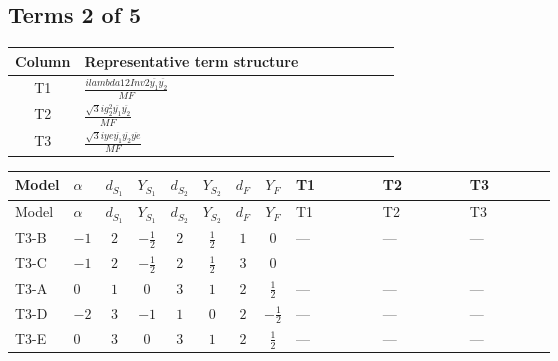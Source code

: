 \documentclass[8pt]{article}
\begin{document}
\begin{landscape}
\subsection*{Terms 2 of 5}
\begin{center}
\begin{tabular}{@{}c >{\raggedright\arraybackslash}p{0.82\linewidth}@{}}
\toprule
Column & Representative term structure \\
\midrule
T1 & \(\displaystyle \frac{i lambda12Inv2 \overline{y_{1}} \overline{y_{2}}}{MF}\) \\
\midrule
T2 & \(\displaystyle \frac{\sqrt{3} i g_{2}^{2} \overline{y_{1}} \overline{y_{2}}}{MF}\) \\
\midrule
T3 & \(\displaystyle \frac{\sqrt{3} i ye \overline{y_{1}} \overline{y_{2}} \overline{ye}}{MF}\) \\
\midrule
\bottomrule
\end{tabular}
\end{center}
\smallskip
\tiny
\begin{longtable}{@{}llcccccc >{\raggedright\arraybackslash}p{0.21\linewidth} >{\raggedright\arraybackslash}p{0.21\linewidth} >{\raggedright\arraybackslash}p{0.21\linewidth}@{}}
\toprule
Model & $\alpha$ & $d_{S_1}$ & $Y_{S_1}$ & $d_{S_2}$ & $Y_{S_2}$ & $d_F$ & $Y_F$ & T1 & T2 & T3 \\
\midrule
\endfirsthead
\toprule
Model & $\alpha$ & $d_{S_1}$ & $Y_{S_1}$ & $d_{S_2}$ & $Y_{S_2}$ & $d_F$ & $Y_F$ & T1 & T2 & T3 \\
\midrule
\endhead
T3-B & $-1$ & $2$ & $-\frac{1}{2}$ & $2$ & $\frac{1}{2}$ & $1$ & $0$ & --- & --- & --- \\
\midrule
T3-C & $-1$ & $2$ & $-\frac{1}{2}$ & $2$ & $\frac{1}{2}$ & $3$ & $0$ & \scriptsize\adjustbox{max width=\linewidth}{$\begin{gathered} - \frac{2 i lambda12Inv2 \overline{y_{1}} \overline{y_{2}}}{3 MF}\end{gathered}$} & \scriptsize\adjustbox{max width=\linewidth}{$\begin{gathered} - \frac{\sqrt{3} i g_{2}^{2} \overline{y_{1}} \overline{y_{2}}}{2 MF}\end{gathered}$} & \scriptsize\adjustbox{max width=\linewidth}{$\begin{gathered} \frac{\sqrt{3} i ye \overline{y_{1}} \overline{y_{2}} \overline{ye}}{6 MF}\end{gathered}$} \\
\midrule
T3-A & $0$ & $1$ & $0$ & $3$ & $1$ & $2$ & $\frac{1}{2}$ & --- & --- & --- \\
\midrule
T3-D & $-2$ & $3$ & $-1$ & $1$ & $0$ & $2$ & $-\frac{1}{2}$ & --- & --- & --- \\
\midrule
T3-E & $0$ & $3$ & $0$ & $3$ & $1$ & $2$ & $\frac{1}{2}$ & --- & --- & --- \\
\midrule
\bottomrule
\end{longtable}
\clearpage

\end{landscape}
\end{document}
